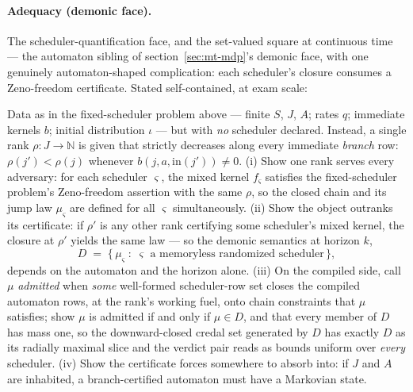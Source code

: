 \paragraph{Adequacy (demonic face).} The scheduler-quantification
face, and the set-valued square at continuous time --- the automaton
sibling of section~\ref{sec:mt-mdp}'s demonic face, with one genuinely
automaton-shaped complication: each scheduler's closure consumes a
Zeno-freedom certificate.  Stated self-contained, at exam scale:

\begin{problem}
\label{prob:mt-ma-demonic}
Data as in the fixed-scheduler problem above ---
finite $S$, $J$, $A$; rates $q$; immediate kernels $b$; initial
distribution $\iota$ --- but with \emph{no} scheduler declared.
Instead, a single rank $\rho \colon J \to \mathbb{N}$ is given that
strictly decreases along every immediate \emph{branch} row:
$\rho(j') < \rho(j)$ whenever $b(j, a, \mathrm{in}(j')) \neq 0$.  (i)
Show one rank serves every adversary: for each scheduler $\varsigma$,
the mixed kernel $f_\varsigma$ satisfies the fixed-scheduler problem's
Zeno-freedom assertion with the same $\rho$, so the closed chain and
its jump law $\mu_\varsigma$ are defined for all $\varsigma$
simultaneously.  (ii) Show the object outranks its certificate: if
$\rho'$ is any other rank certifying some scheduler's mixed kernel,
the closure at $\rho'$ yields the same law --- so the demonic
semantics at horizon $k$,
\[
  D \;=\; \bigl\{\, \mu_\varsigma \;:\; \varsigma \text{ a memoryless
  randomized scheduler} \,\bigr\},
\]
depends on the automaton and the horizon alone.  (iii) On the compiled
side, call $\mu$ \emph{admitted} when \emph{some} well-formed
scheduler-row set closes the compiled automaton rows, at the rank's
working fuel, onto chain constraints that $\mu$ satisfies; show $\mu$
is admitted if and only if $\mu \in D$, and that every member of $D$
has mass one, so the downward-closed credal set generated by $D$ has
exactly $D$ as its radially maximal slice and the verdict pair reads
as bounds uniform over \emph{every} scheduler.  (iv) Show the
certificate forces somewhere to absorb into: if $J$ and $A$ are
inhabited, a branch-certified automaton must have a Markovian state.
\end{problem}

